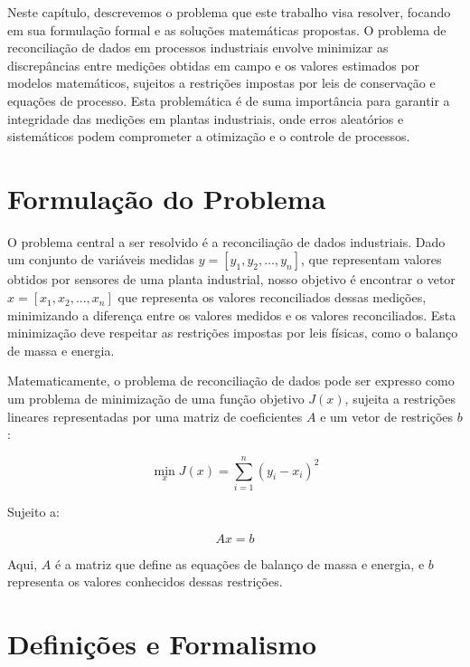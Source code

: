 \label{Cap:Problema}

Neste capítulo, descrevemos o problema que este trabalho visa resolver, focando em sua formulação formal e as soluções matemáticas propostas. O problema de reconciliação de dados em processos industriais envolve minimizar as discrepâncias entre medições obtidas em campo e os valores estimados por modelos matemáticos, sujeitos a restrições impostas por leis de conservação e equações de processo. Esta problemática é de suma importância para garantir a integridade das medições em plantas industriais, onde erros aleatórios e sistemáticos podem comprometer a otimização e o controle de processos.

\section{Formulação do Problema}
\label{Sec:FormulacaoProblema}

O problema central a ser resolvido é a reconciliação de dados industriais. Dado um conjunto de variáveis medidas $y = [y_1, y_2, ..., y_n]$, que representam valores obtidos por sensores de uma planta industrial, nosso objetivo é encontrar o vetor $x = [x_1, x_2, ..., x_n]$ que representa os valores reconciliados dessas medições, minimizando a diferença entre os valores medidos e os valores reconciliados. Esta minimização deve respeitar as restrições impostas por leis físicas, como o balanço de massa e energia.

Matematicamente, o problema de reconciliação de dados pode ser expresso como um problema de minimização de uma função objetivo $J(x)$, sujeita a restrições lineares representadas por uma matriz de coeficientes $A$ e um vetor de restrições $b$:

\begin{equation}
\min_x J(x) = \sum_{i=1}^{n} (y_i - x_i)^2
\end{equation}

Sujeito a:

\begin{equation}
Ax = b
\end{equation}

Aqui, $A$ é a matriz que define as equações de balanço de massa e energia, e $b$ representa os valores conhecidos dessas restrições.

\section{Definições e Formalismo}
\label{Sec:DefinicoesFormalismo}

